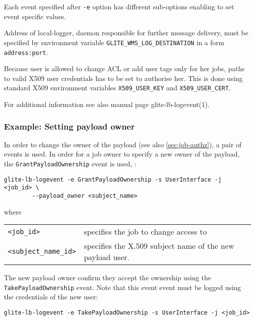 
Each event specified after \verb'-e' option has different sub-options enabling
to set event specific values.

Address of local-logger, daemon responsible for further message delivery, must 
be specified by environment
variable \verb'GLITE_WMS_LOG_DESTINATION' in a form \verb'address:port'.

Because user is allowed to change ACL or add user tags only for her jobs, paths
to valid X509 user credentials has to be set to authorise her. This is done
using standard X509 environment variables \verb'X509_USER_KEY' and
\verb'X509_USER_CERT'.

For additional information see also manual page glite-lb-logevent(1).





\subsubsection{Example: Setting payload owner}
\label{e:payload_owner}

In order to change the owner of the payload (see also \ref{sec:job-authz}),
a pair of \LB events is used. In order for a job owner to specify a new
owner of the payload, the \verb'GrantPayloadOwnership' event is used, \eg:

\begin{verbatim}
glite-lb-logevent -e GrantPayloadOwnership -s UserInterface -j <job_id> \
        --payload_owner <subject_name>
\end{verbatim}

where

\begin{tabularx}{\textwidth}{>{\texttt}lX}
\verb'<job_id>'    & specifies the job to change access to\\
\verb'<subject_name_id>'   & specifies the X.509 subject name of the new payload user. \\
\end{tabularx}

The new payload owner confirm they accept the ownership using the
\verb'TakePayloadOwnership' event. Note that this event event must be
logged using the credentials of the new user:

\begin{verbatim}
glite-lb-logevent -e TakePayloadOwnership -s UserInterface -j <job_id>
\end{verbatim}
